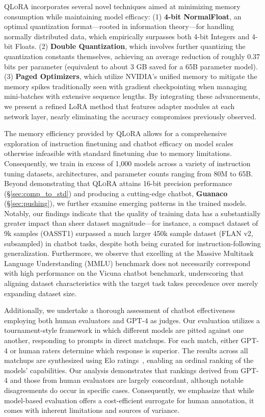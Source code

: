 \textsc{QLoRA} incorporates several novel techniques aimed at minimizing memory consumption while maintaining model efficacy: (1) \textbf{4-bit NormalFloat}, an optimal quantization format—rooted in information theory—for handling normally distributed data, which empirically surpasses both 4-bit Integers and 4-bit Floats. (2) \textbf{Double Quantization}, which involves further quantizing the quantization constants themselves, achieving an average reduction of roughly 0.37 bits per parameter (equivalent to about 3 GB saved for a 65B parameter model). (3) \textbf{Paged Optimizers}, which utilize NVIDIA's unified memory to mitigate the memory spikes traditionally seen with gradient checkpointing when managing mini-batches with extensive sequence lengths. By integrating these advancements, we present a refined LoRA method that features adapter modules at each network layer, nearly eliminating the accuracy compromises previously observed.

The memory efficiency provided by \textsc{QLoRA} allows for a comprehensive exploration of instruction finetuning and chatbot efficacy on model scales otherwise infeasible with standard finetuning due to memory limitations. Consequently, we train in excess of 1,000 models across a variety of instruction tuning datasets, architectures, and parameter counts ranging from 80M to 65B. Beyond demonstrating that \textsc{QLoRA} attains 16-bit precision performance (\S\ref{sec:comp_to_std}) and producing a cutting-edge chatbot, \textbf{Guanaco} (\S\ref{sec:pushing}), we further examine emerging patterns in the trained models. Notably, our findings indicate that the quality of training data has a substantially greater impact than sheer dataset magnitude—for instance, a compact dataset of 9k samples (OASST1) surpassed a much larger 450k sample dataset (FLAN v2, subsampled) in chatbot tasks, despite both being curated for instruction-following generalization. Furthermore, we observe that excelling at the Massive Multitask Language Understanding (MMLU) benchmark does not necessarily correspond with high performance on the Vicuna chatbot benchmark, underscoring that aligning dataset characteristics with the target task takes precedence over merely expanding dataset size.

Additionally, we undertake a thorough assessment of chatbot effectiveness employing both human evaluators and GPT-4 as judges. Our evaluation utilizes a tournament-style framework in which different models are pitted against one another, responding to prompts in direct matchups. For each match, either GPT-4 or human raters determine which response is superior. The results across all matchups are synthesized using Elo ratings~\citep{elo1967proposed, elo1978rating}, enabling an ordinal ranking of the models’ capabilities. Our analysis demonstrates that rankings derived from GPT-4 and those from human evaluators are largely concordant, although notable disagreements do occur in specific cases. Consequently, we emphasize that while model-based evaluation offers a cost-efficient surrogate for human annotation, it comes with inherent limitations and sources of variance.


